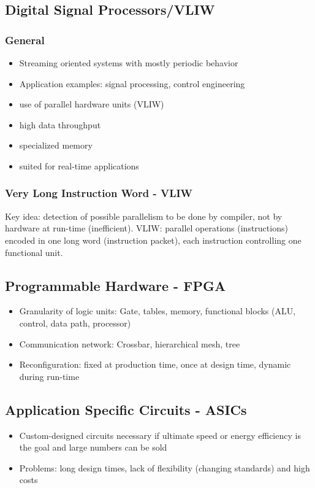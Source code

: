 \subsection{Digital Signal Processors/VLIW}
\subsubsection{General}
\begin{itemize}[noitemsep]
\item Streaming oriented systems
with mostly periodic 
behavior 
\item Application examples: signal processing, control 
engineering
\item use of parallel hardware units (VLIW)
\item high data throughput
\item specialized memory
\item suited for real-time
applications
\end{itemize}

\subsubsection{Very Long Instruction Word - VLIW}
Key idea: detection of possible parallelism to be done by compiler, not by hardware at run-time (inefficient). VLIW: parallel operations (instructions) encoded in one long word (instruction packet), each instruction controlling one functional unit.


\subsection{Programmable Hardware - FPGA}
\begin{itemize}[noitemsep]
\item Granularity of logic units: Gate, tables, memory, functional blocks (ALU, control, data 
path, processor)
\item Communication network: Crossbar, hierarchical mesh, tree
\item Reconfiguration: fixed at production time, once at design time, dynamic during run-time
\end{itemize}

\subsection{Application Specific Circuits - ASICs}
\begin{itemize}[noitemsep]
\item Custom-designed circuits necessary if ultimate speed or energy efficiency is the goal and large numbers can be sold
\item Problems: long design times, lack of flexibility (changing standards) and high costs
\end{itemize}

